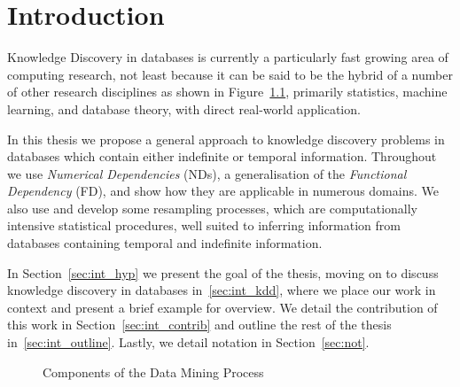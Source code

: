\chapter{Introduction}\label{chap:intro}

Knowledge Discovery in databases is currently a particularly fast
growing area of computing research, not least
because it can be said 
to be the hybrid of a number of other research disciplines as shown in
Figure~\ref{fig:dm_process}, primarily statistics, machine learning,
and database theory, with direct real-world application.

\medskip

In this thesis we propose a general approach to
knowledge discovery
problems in databases which contain either indefinite or temporal
information. Throughout we use {\em Numerical Dependencies} (NDs), a
generalisation of the {\em Functional Dependency} (FD), and  
show how they are applicable in numerous domains.  We also use and develop some
resampling processes, which are computationally intensive statistical  
procedures, well suited to inferring information from  
databases containing temporal and indefinite information.  

In Section~\ref{sec:int_hyp} we present the goal of the thesis, moving
on to discuss knowledge discovery in databases 
in~\ref{sec:int_kdd}, where we place our work in context and present a
brief example for overview. We detail
the contribution of this work in 
Section~\ref{sec:int_contrib} and outline the rest of the
thesis in~\ref{sec:int_outline}. Lastly, we detail notation in
Section~\ref{sec:not}. 

\begin{figure}
\centerline{}
\caption{\label{fig:dm_process}Components of the Data
Mining Process}
\end{figure}

